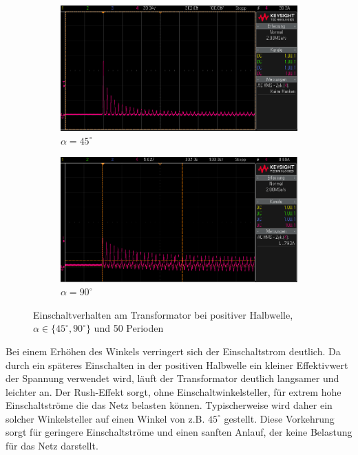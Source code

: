 \documentclass{article}
\begin{document}
\begin{figure}[h]
  \centering
  \begin{subfigure}{.45\textwidth}
    \centering
    \includegraphics[width=\linewidth]{../assets/images/gep3/einschalt_45deg.png}
    \caption{$\alpha = 45^{\circ}$}
  \end{subfigure}
  \begin{subfigure}{.45\textwidth}
    \centering
    \includegraphics[width=\linewidth]{../assets/images/gep3/einschalt_90deg.png}
    \caption{$\alpha = 90^{\circ}$}
  \end{subfigure}
  \label{fig:31_242}
  \caption{Einschaltverhalten am Transformator bei positiver Halbwelle, $\alpha \in \{45^{\circ}, 90^{\circ}\}$ und 50 Perioden}
\end{figure}

 Bei einem Erhöhen des Winkels verringert sich der Einschaltstrom deutlich. Da durch ein späteres Einschalten in der positiven Halbwelle ein kleiner Effektivwert der Spannung verwendet wird, läuft der Transformator deutlich langsamer und leichter an. Der Rush-Effekt sorgt, ohne Einschaltwinkelsteller, für extrem hohe Einschaltströme die das Netz belasten können. Typischerweise wird daher ein solcher Winkelsteller auf einen Winkel von z.B. $45^{\circ}$ gestellt. Diese Vorkehrung sorgt für geringere Einschaltströme und einen sanften Anlauf, der keine Belastung für das Netz darstellt.
\newpage
\end{document}
